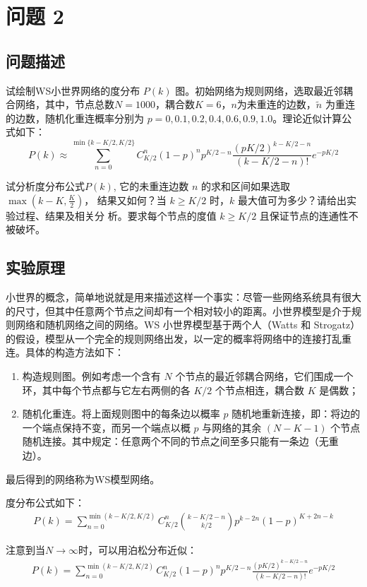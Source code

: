 \documentclass{article}
\begin{document}
\section{问题 2}

\subsection{问题描述}

试绘制WS小世界网络的度分布 $P(k)$ 图。初始网络为规则网络，选取最近邻耦合网络，其中，节点总数$N=1000$，耦合数$K=6$，$n$为未重连的边数，$\widetilde{n}$ 为重连的边数，随机化重连概率分别为 $p=0,0.1,0.2,0.4,0.6,0.9,1.0$。理论近似计算公式如下：
$$
P(k)\approx \sum_{n=0}^{\min\{k-K/2,K/2\}}C_{K/2}^{n}(1-p)^{n}p^{K/2-n}\frac{(pK/2)^{k-K/2-n}}{(k-K/2-n)!}e^{-pK/2}
$$

试分析度分布公式$P(k)$, 它的未重连边数 $n$ 的求和区间如果选取 $\max(k-K,\frac{K}{2})$，
结果又如何？当 $k\geq K/2$ 时，$k$ 最大值可为多少？请给出实验过程、结果及相关分
析。要求每个节点的度值 $k\geq K/2$ 且保证节点的连通性不被破坏。

\subsection{实验原理}

小世界的概念，简单地说就是用来描述这样一个事实：尽管一些网络系统具有很大的尺寸，但其中任意两个节点之间却有一个相对较小的距离。小世界模型是介于规则网络和随机网络之间的网络。WS 小世界模型基于两个人（Watts 和 Strogatz）的假设，模型从一个完全的规则网络出发，以一定的概率将网络中的连接打乱重连。具体的构造方法如下：
\begin{enumerate}
    \item 构造规则图。例如考虑一个含有 $N$ 个节点的最近邻耦合网络，它们围成一个环，其中每个节点都与它左右两侧的各 $K/2$ 个节点相连，耦合数 $K$ 是偶数；
    \item 随机化重连。将上面规则图中的每条边以概率 $p$ 随机地重新连接，即：将边的一个端点保持不变，而另一个端点以概 $p$ 与网络的其余 $(N-K-1)$ 个节点随机连接。其中规定：任意两个不同的节点之间至多只能有一条边（无重边）。
\end{enumerate}
最后得到的网络称为WS模型网络。

度分布公式如下：
\begin{align}
    P(k) = \sum_{n=0}^{\min(k-K/2,K/2)} C_{K/2}^{n} \binom{k-K/2-n}{k/2} p^{k-2n}
    (1-p)^{K+2n-k}
\end{align}

注意到当$N\to\infty$时，可以用泊松分布近似：
\begin{align}
    P(k) = \sum_{n=0}^{\min(k-K/2,K/2)} C_{K/2}^{n} (1-p)^n p^{K/2-n} \frac{{(pK/2)}^{k-K/2-n}}{(k-K/2-n)!} e^{-pK/2}
    \label{sg}
\end{align}
\end{document}

